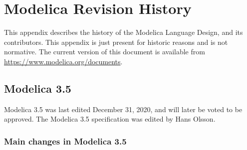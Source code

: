 \chapter{Modelica Revision History}\label{modelica-revision-history}

This appendix describes the history of the Modelica Language Design, and
its contributors. This appendix is just present for historic reasons and
is not normative. The current version of this document is available from
\url{https://www.modelica.org/documents}.

\section{Modelica 3.5}\label{modelica-3-5}

Modelica 3.5 was last edited December 31, 2020, and will later be voted to be approved.
The Modelica 3.5 specification was edited by Hans Olsson.

\subsection{Main changes in Modelica 3.5}\label{main-changes-in-modelica-3-5}

